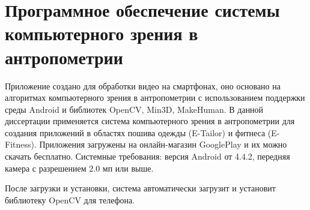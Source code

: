 \section{Программное обеспечение системы компьютерного зрения в антропометрии}
Приложение создано для обработки видео на смартфонах, оно основано на алгоритмах компьютерного зрения в антропометрии с использованием поддержки среды Android и библиотек OpenCV, Min3D, MakeHuman. В данной диссертации применяется система компьютерного зрения в антропометрии для создания приложений в областях пошива одежды (E-Tailor) и фитнеса (E-Fitness). Приложения загружены на онлайн-магазин GooglePlay и их можно скачать бесплатно. Системные требования: версия Android от 4.4.2, передняя камера с разрешением 2.0 мп или выше.

После загрузки и установки, система автоматически загрузит и установит библиотеку OpenCV для телефона.



